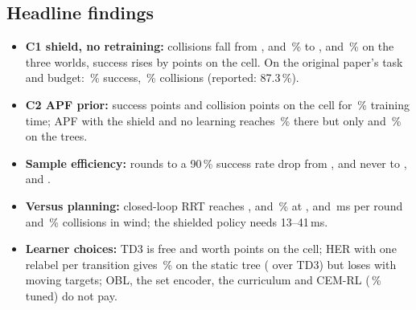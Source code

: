 \documentclass[conference]{IEEEtran}
\begin{document}
\subsection{Headline findings}
\begin{itemize}
\item \textbf{C1 shield, no retraining:} collisions fall from \Cstaticbase{}, \Cwindbase{} and \Curebase{}\,\% to \Cstaticshieldevalcm{}, \Cwindshieldevalcm{} and \Cureshieldevalcm{}\,\% on the three worlds, success rises by \gSureshieldevalcm{} points on the cell. On the original paper's task and budget: \Sstaticshieldevalcmk{}\,\% success, \Cstaticshieldevalcmk{}\,\% collisions (reported: 87.3\,\%).
\item \textbf{C2 APF prior:} \gSuretdherapf{} success points and \gCuretdherapf{} collision points on the cell for \gWuretdherapf{}\,\% training time; APF with the shield and no learning reaches \Sureapfshieldeval{}\,\% there but only \Sstaticapfshieldeval{} and \Swindapfshieldeval{}\,\% on the trees.
\item \textbf{Sample efficiency:} rounds to a 90\,\% success rate drop from \Rstaticbase{}, \Rwindbase{} and never to \Rstaticfullk{}, \Rwindfullk{} and \Rurefullk{}.
\item \textbf{Versus planning:} closed-loop RRT reaches \Sstaticreplan{}, \Swindreplan{} and \Surereplan{}\,\% at \Tstaticreplan{}, \Twindreplan{} and \Turereplan{}\,ms per round and \Cwindreplan{}\,\% collisions in wind; the shielded policy needs 13--41\,ms.
\item \textbf{Learner choices:} TD3 is free and worth \gSuretd{} points on the cell; HER with one relabel per transition gives \Sstaticherk{}\,\% on the static tree (\gSstaticherk{} over TD3) but loses with moving targets; OBL, the set encoder, the curriculum and CEM-RL (\Sstaticcemslr{}\,\% tuned) do not pay.
\end{itemize}
\end{document}

